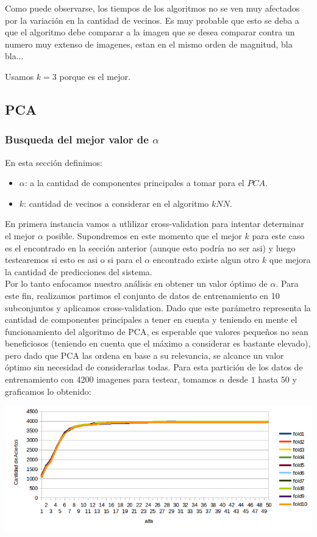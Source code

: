 Como puede observarse, los tiempos de los algoritmos no se ven muy afectados por la variación en la cantidad de vecinos. Es muy probable que esto se deba a que el algoritmo debe comparar a la imagen que se desea comparar contra un numero muy extenso de imagenes, estan en el mismo orden de magnitud, bla bla...
\completar

Usamos $k=3$ porque es el mejor.

\subsection{PCA}
\subsubsection{Busqueda del mejor valor de $\alpha$}
En esta sección definimos:
\begin{itemize}
	\item $\alpha$: a la cantidad de componentes principales a tomar para el $PCA$.
	\item $k$: cantidad de vecinos a considerar en el algoritmo $kNN$.
\end{itemize}
En primera instancia vamos a utlilizar cross-validation para intentar determinar el mejor $\alpha$ posible. Supondremos en este momento que el mejor $k$ para este caso es el encontrado en la sección anterior (aunque esto podría no ser asi) y luego testearemos si esto es asi o si para el $\alpha$ encontrado existe algun otro $k$ que mejora la cantidad de predicciones del sistema.
\\
Por lo tanto enfocamos nuestro análisis en obtener un valor óptimo de $\alpha$. Para este fin, realizamos partimos el conjunto de datos de entrenamiento en 10 subconjuntos y aplicamos cross-validation. Dado que este parámetro representa la cantidad de componentes principales a tener en cuenta y teniendo en mente el funcionamiento del algoritmo de PCA, es esperable que valores pequeños no sean beneficiosos (teniendo en cuenta que el máximo a considerar es bastante elevado), pero dado que PCA las ordena en base a su relevancia, se alcance un valor óptimo sin necesidad de considerarlas todas. Para esta partición de los datos de entrenamiento con 4200 imagenes para testear, tomamos $\alpha$ desde $1$ hasta $50$ y graficamos lo obtenido:

\begin{center}
\includegraphics[scale=0.68]{nuevosResultados/pca/pca1.png}
\end{center}


